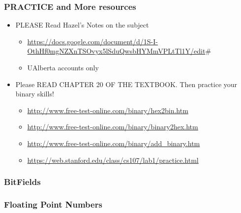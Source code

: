 \documentclass[11pt]{article}
\begin{document}
\subsubsection{PRACTICE and More resources}
\label{sec:org70e0fe2}

\begin{itemize}
\item PLEASE Read Hazel's Notes on the subject 
\begin{itemize}
\item \url{https://docs.google.com/document/d/1S-I-OthHf0mgNZXnTSOvyx5lSduQwsbHYMmVPLtTl1Y/edit}\#
\item UAlberta accounts only
\end{itemize}

\item Please READ CHAPTER 20 OF THE TEXTBOOK. Then practice your binary skills!
\begin{itemize}
\item \url{http://www.free-test-online.com/binary/hex2bin.htm}
\item \url{http://www.free-test-online.com/binary/binary2hex.htm}
\item \url{http://www.free-test-online.com/binary/add\_binary.htm}
\item \url{https://web.stanford.edu/class/cs107/lab1/practice.html}
\end{itemize}
\end{itemize}


\subsubsection{BitFields}
\label{sec:org88cc65b}



\subsubsection{Floating Point Numbers}
\label{sec:org6b8a304}
\end{document}
